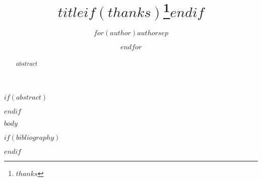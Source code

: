 \documentclass[
$if(fontsize)$
  $fontsize$,
$endif$
$if(lang)$
  $babel-lang$,
$endif$
$if(papersize)$
  $papersize$paper,
$endif$
$if(beamer)$
  ignorenonframetext,
$if(handout)$
  handout,
$endif$
$if(aspectratio)$
  aspectratio=$aspectratio$,
$endif$
$endif$
$for(classoption)$
  $classoption$$sep$,
$endfor$
]{$documentclass$}
\title{$title$$if(thanks)$\thanks{$thanks$}$endif$}
\author{$for(author)$$author$$sep$ \and $endfor$}
\begin{document}
    \maketitle
    $if(abstract)$
    \begin{abstract}
        $abstract$
    \end{abstract}
    $endif$

    $body$

    $if(bibliography)$
    
    $endif$
\end{document}
